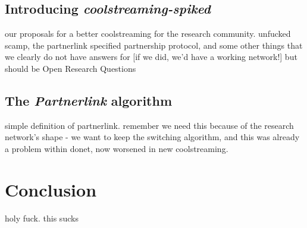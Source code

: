 \documentclass[12pt,a4paper]{article}
\begin{document}
\subsection{Introducing \textit{coolstreaming-spiked}}
our proposals for a better coolstreaming for the research community. unfucked scamp, the partnerlink specified partnership protocol, and some other things that we clearly do not have answers for [if we did, we'd have a working network!] but should be Open Research Questions
\subsection{The \textit{Partnerlink} algorithm}
simple definition of partnerlink. remember we need this because of the research network's shape - we want to keep the switching algorithm, and this was already a problem within donet, now worsened in new coolstreaming.
\section{Conclusion}
holy fuck. this sucks

\printbibliography
\end{document}
